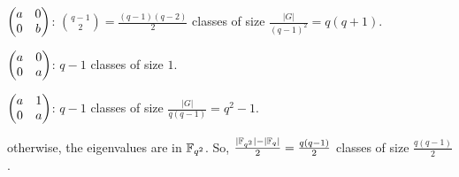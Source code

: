 \documentclass{../exp}
\begin{document}
\begin{ex}
$ $
\begin{cond}
\item $\begin{pmatrix}a&0\\0&b\end{pmatrix}$: ${q-1\choose 2}=\frac{(q-1)(q-2)}2$ classes of size $\frac{|G|}{(q-1)^2}=q(q+1)$.
\item $\begin{pmatrix}a&0\\0&a\end{pmatrix}$: $q-1$ classes of size $1$.
\item $\begin{pmatrix}a&1\\0&a\end{pmatrix}$: $q-1$ classes of size $\frac{|G|}{q(q-1)}=q^2-1$.
\item otherwise, the eigenvalues are in $\mathbb{F}_{q^2}$. So, $\frac{|\mathbb{F}_{q^2}|-|\mathbb{F}_q|}2=\frac{q(q-1)}2$ classes of size $\frac{q(q-1)}2$.
\end{cond}
\end{ex}



\begin{ex}[$|G|=p^3$]
\end{ex}
\end{document}
